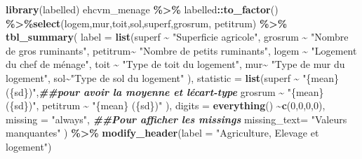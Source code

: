 \documentclass[
]{article}
\newenvironment{Shaded}{\begin{snugshade}}{\end{snugshade}}
\newcommand{\AttributeTok}[1]{\textcolor[rgb]{0.13,0.29,0.53}{#1}}
\newcommand{\DecValTok}[1]{\textcolor[rgb]{0.00,0.00,0.81}{#1}}
\newcommand{\DocumentationTok}[1]{\textcolor[rgb]{0.56,0.35,0.01}{\textbf{\textit{#1}}}}
\newcommand{\FunctionTok}[1]{\textcolor[rgb]{0.13,0.29,0.53}{\textbf{#1}}}
\newcommand{\NormalTok}[1]{#1}
\newcommand{\SpecialCharTok}[1]{\textcolor[rgb]{0.81,0.36,0.00}{\textbf{#1}}}
\newcommand{\StringTok}[1]{\textcolor[rgb]{0.31,0.60,0.02}{#1}}
\begin{document}
\begin{Shaded}
\begin{Highlighting}[]
\FunctionTok{library}\NormalTok{(labelled)}
\NormalTok{ehcvm\_menage }\SpecialCharTok{\%\textgreater{}\%}\NormalTok{ labelled}\SpecialCharTok{::}\FunctionTok{to\_factor}\NormalTok{() }\SpecialCharTok{\%\textgreater{}\%}\FunctionTok{select}\NormalTok{(logem,mur,toit,sol,superf,grosrum, petitrum) }\SpecialCharTok{\%\textgreater{}\%} \FunctionTok{tbl\_summary}\NormalTok{( }\AttributeTok{label =} \FunctionTok{list}\NormalTok{(superf }\SpecialCharTok{\textasciitilde{}} \StringTok{"Superficie agricole"}\NormalTok{,}
\NormalTok{ grosrum }\SpecialCharTok{\textasciitilde{}} \StringTok{"Nombre de gros ruminants"}\NormalTok{,}
\NormalTok{ petitrum}\SpecialCharTok{\textasciitilde{}} \StringTok{"Nombre de petits ruminants"}\NormalTok{,}
\NormalTok{ logem }\SpecialCharTok{\textasciitilde{}} \StringTok{"Logement du chef de ménage"}\NormalTok{,}
\NormalTok{ toit }\SpecialCharTok{\textasciitilde{}} \StringTok{"Type de toit du logement"}\NormalTok{,}
\NormalTok{ mur}\SpecialCharTok{\textasciitilde{}} \StringTok{"Type de mur du logement"}\NormalTok{,}
\NormalTok{ sol}\SpecialCharTok{\textasciitilde{}}\StringTok{"Type de sol du logement"}
\NormalTok{ ),}
 \AttributeTok{statistic =} \FunctionTok{list}\NormalTok{(superf }\SpecialCharTok{\textasciitilde{}} \StringTok{"\{mean\} (\{sd\})"}\NormalTok{,}\DocumentationTok{\#\#pour avoir la moyenne et l\textquotesingle{}écart{-}type}
\NormalTok{                  grosrum }\SpecialCharTok{\textasciitilde{}} \StringTok{"\{mean\} (\{sd\})"}\NormalTok{,}
\NormalTok{                  petitrum }\SpecialCharTok{\textasciitilde{}} \StringTok{"\{mean\} (\{sd\})"}
\NormalTok{                  ),}
 \AttributeTok{digits =} \FunctionTok{everything}\NormalTok{() }\SpecialCharTok{\textasciitilde{}}\FunctionTok{c}\NormalTok{(}\DecValTok{0}\NormalTok{,}\DecValTok{0}\NormalTok{,}\DecValTok{0}\NormalTok{,}\DecValTok{0}\NormalTok{),}
 \AttributeTok{missing =} \StringTok{"always"}\NormalTok{,  }\DocumentationTok{\#\#Pour afficher les missings}
 \AttributeTok{missing\_text=} \StringTok{"Valeurs manquantes"}
\NormalTok{ ) }\SpecialCharTok{\%\textgreater{}\%} \FunctionTok{modify\_header}\NormalTok{(}\AttributeTok{label =} \StringTok{"Agriculture, Elevage et logement"}\NormalTok{)}
\end{Highlighting}
\end{Shaded}
\end{document}
